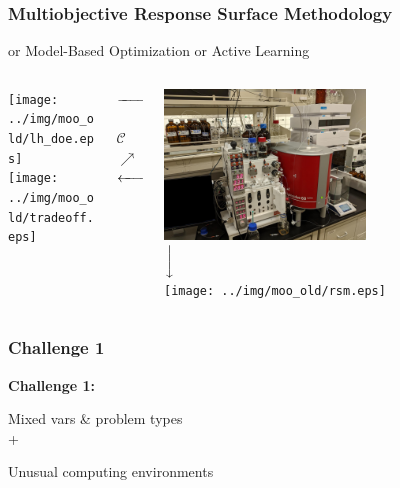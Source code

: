 \documentclass[aspectratio=169]{beamer}
\newcommand{\xdownarrow}[1]{%
  {\left\downarrow\vbox to #1{}\right.\kern-\nulldelimiterspace}
}
\begin{document}
\begin{frame}\frametitle{Multiobjective Response Surface Methodology}
{or Model-Based Optimization or Active Learning}
\begin{columns}
\begin{column}{0.4\textwidth}
\begin{center}
\texttt{[image: ../img/moo\_old/lh\_doe.eps]}\\%
\medskip
\vskip 0.5cm
\medskip
\texttt{[image: ../img/moo\_old/tradeoff.eps]}%
\end{center}
\end{column}
\begin{column}{0.2\textwidth}
\begin{center}
$\xrightarrow{\hspace*{1.5cm}}$%
\\
\vskip 1.2cm
$\qquad\qquad\nearrow$\\
{\Huge $\mathcal{C}$}\\
$\nearrow\qquad\qquad$%
\\
\vskip 1cm
$\xleftarrow{\hspace*{1.5cm}}$%
\end{center}
\end{column}
\begin{column}{0.4\textwidth}
\begin{center}
\includegraphics[width=0.58\textwidth]{../img/probs/cfr-nmr-setup.jpg}%
\\
\medskip
$\xdownarrow{0.5cm}$\\
\medskip
\texttt{[image: ../img/moo\_old/rsm.eps]}%
\end{center}
\end{column}
\end{columns}
\end{frame}

\begin{frame}\frametitle{Challenge 1}
\vfill
\begin{center}
{\Huge \bf
Challenge 1:\\

\bigskip

Mixed vars \& problem types\\
+\\
\medskip

Unusual computing environments
}
\end{center}
\vfill
\end{frame}
\end{document}
